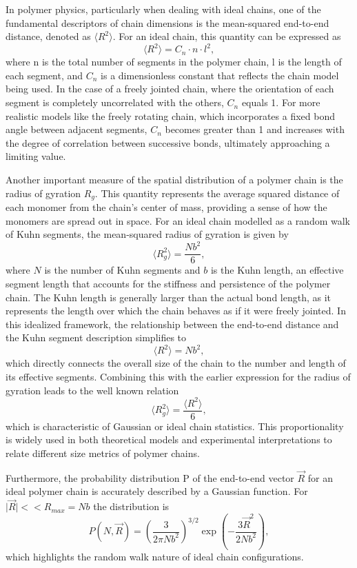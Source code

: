 \documentclass{article}      %
\begin{document}
In polymer physics, particularly when dealing with ideal chains, one of the fundamental descriptors of chain dimensions is the mean-squared end-to-end distance, denoted as $\langle R^2 \rangle$. For an ideal chain, this quantity can be expressed as
\[
\langle R^2 \rangle = C_n \cdot n \cdot l^2,
\]
where n is the total number of segments in the polymer chain, l is the length of each segment, and $C_n$ is a dimensionless constant that reflects the chain model being used. In the case of a freely jointed chain, where the orientation of each segment is completely uncorrelated with the others, $C_n$ equals 1. For more realistic models like the freely rotating chain, which incorporates a fixed bond angle between adjacent segments, $C_n$ becomes greater than 1 and increases with the degree of correlation between successive bonds, ultimately approaching a limiting value.

Another important measure of the spatial distribution of a polymer chain is the radius of gyration $R_g$. This quantity represents the average squared distance of each monomer from the chain’s center of mass, providing a sense of how the monomers are spread out in space. For an ideal chain modelled as a random walk of Kuhn segments, the mean-squared radius of gyration is given by
\[
\langle R_g^2 \rangle = \frac{N b^2}{6},
\]
where $N$ is the number of Kuhn segments and $b$ is the Kuhn length, an effective segment length that accounts for the stiffness and persistence of the polymer chain. The Kuhn length is generally larger than the actual bond length, as it represents the length over which the chain behaves as if it were freely jointed.
In this idealized framework, the relationship between the end-to-end distance and the Kuhn segment description simplifies to
\[
\langle R^2 \rangle = N b^2,
\]
which directly connects the overall size of the chain to the number and length of its effective segments. Combining this with the earlier expression for the radius of gyration leads to the well known relation
\[
\langle R_g^2 \rangle = \frac{\langle R^2 \rangle}{6},
\]
which is characteristic of Gaussian or ideal chain statistics. This proportionality is widely used in both theoretical models and experimental interpretations to relate different size metrics of polymer chains.

Furthermore, the probability distribution P of the end-to-end vector $\vec{R}$ for an ideal polymer chain is accurately described by a Gaussian function. For $\vert \vec{R} \vert << R_{max} = Nb $ the distribution is
\[
P(N, \vec{R}) = \left( \frac{3}{2 \pi N b^2} \right)^{3/2} \exp\left( -\frac{3 \vec{R}^2}{2 N b^2} \right),
\]
which highlights the random walk nature of ideal chain configurations.
\end{document}

